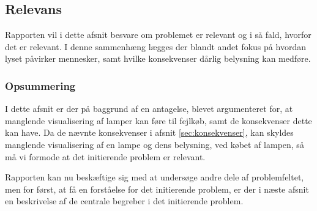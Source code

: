 \subsection{Relevans}
Rapporten vil i dette afsnit besvare om problemet er relevant og i så fald, hvorfor det er relevant. I denne sammenhæng lægges der blandt andet fokus på hvordan lyset påvirker mennesker, samt hvilke konsekvenser dårlig belysning kan medføre. 





\subsubsection*{Opsummering}
I dette afsnit er der på baggrund af en antagelse, blevet argumenteret for, at manglende visualisering af lamper kan føre til fejlkøb, samt de konsekvenser dette kan have. Da de nævnte konsekvenser i afsnit \ref{sec:konsekvenser}, kan skyldes manglende visualisering af en lampe og dens belysning, ved købet af lampen, så må vi formode at det initierende problem er relevant.

Rapporten kan nu beskæftige sig med at undersøge andre dele af problemfeltet, men for først, at få en forståelse for det initierende problem, er der i næste afsnit en beskrivelse af de centrale begreber i det initierende problem.
